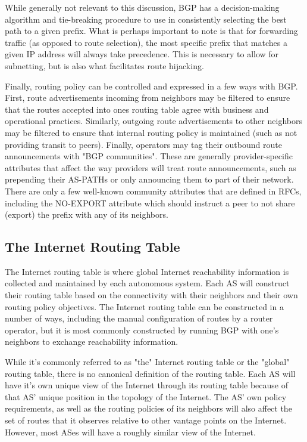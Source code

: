 While generally not relevant to this discussion, BGP has a decision-making algorithm and tie-breaking procedure to use in consistently selecting the best path to a given prefix. What is perhaps important to note is that for forwarding traffic (as opposed to route selection), the most specific prefix that matches a given IP address will always take precedence. This is necessary to allow for subnetting, but is also what facilitates route hijacking.

Finally, routing policy can be controlled and expressed in a few ways with BGP. First, route advertisements incoming from neighbors may be filtered to ensure that the routes accepted into ones routing table agree with business and operational practices. Similarly, outgoing route advertisements to other neighbors may be filtered to ensure that internal routing policy is maintained (such as not providing transit to peers). Finally, operators may tag their outbound route announcements with "BGP communities". These are generally provider-specific attributes that affect the way providers will treat route announcements, such as prepending their AS-PATHs or only announcing them to part of their network. There are only a few well-known community attributes that are defined in RFCs, including the NO-EXPORT attribute which should instruct a peer to not share (export) the prefix with any of its neighbors.

\subsection{The Internet Routing Table}

The Internet routing table is where global Internet reachability information is collected and maintained by each autonomous system. Each AS will construct their routing table based on the connectivity with their neighbors and their own routing policy objectives. The Internet routing table can be constructed in a number of ways, including the manual configuration of routes by a router operator, but it is most commonly constructed by running BGP with one's neighbors to exchange reachability information.

While it's commonly referred to as "the" Internet routing table or the "global" routing table, there is no canonical definition of the routing table. Each AS will have it's own unique view of the Internet through its routing table because of that AS' unique position in the topology of the Internet. The AS' own policy requirements, as well as the routing policies of its neighbors will also affect the set of routes that it observes relative to other vantage points on the Internet. However, most ASes will have a roughly similar view of the Internet.

